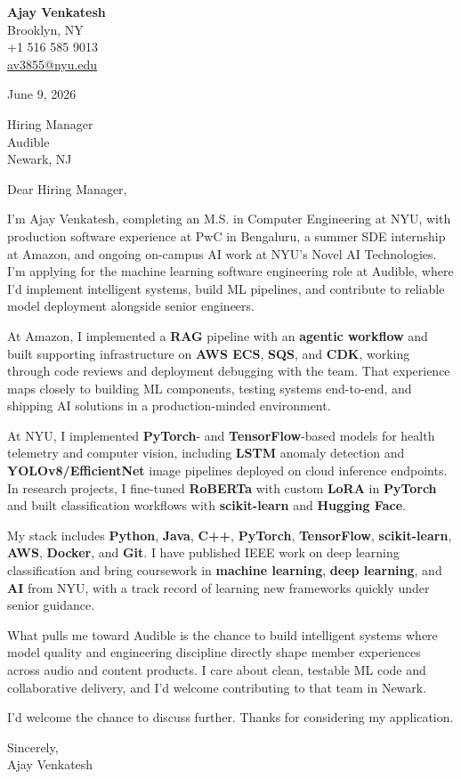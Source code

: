 \documentclass[letterpaper,11pt]{article}
\begin{document}
\begin{flushleft}
\textbf{\large Ajay Venkatesh} \\
Brooklyn, NY \\
+1 516 585 9013 \\
\href{mailto:av3855@nyu.edu}{av3855@nyu.edu}
\end{flushleft}
\vspace{10pt}
June 9, 2026
\vspace{6pt}

Hiring Manager \\
Audible \\
Newark, NJ

\vspace{10pt}

Dear Hiring Manager,

I'm Ajay Venkatesh, completing an M.S. in Computer Engineering at NYU, with production software experience at PwC in Bengaluru, a summer SDE internship at Amazon, and ongoing on-campus AI work at NYU's Novel AI Technologies. I'm applying for the machine learning software engineering role at Audible, where I'd implement intelligent systems, build ML pipelines, and contribute to reliable model deployment alongside senior engineers.

At Amazon, I implemented a \textbf{RAG} pipeline with an \textbf{agentic workflow} and built supporting infrastructure on \textbf{AWS ECS}, \textbf{SQS}, and \textbf{CDK}, working through code reviews and deployment debugging with the team. That experience maps closely to building ML components, testing systems end-to-end, and shipping AI solutions in a production-minded environment.

At NYU, I implemented \textbf{PyTorch}- and \textbf{TensorFlow}-based models for health telemetry and computer vision, including \textbf{LSTM} anomaly detection and \textbf{YOLOv8/EfficientNet} image pipelines deployed on cloud inference endpoints. In research projects, I fine-tuned \textbf{RoBERTa} with custom \textbf{LoRA} in \textbf{PyTorch} and built classification workflows with \textbf{scikit-learn} and \textbf{Hugging Face}.

My stack includes \textbf{Python}, \textbf{Java}, \textbf{C++}, \textbf{PyTorch}, \textbf{TensorFlow}, \textbf{scikit-learn}, \textbf{AWS}, \textbf{Docker}, and \textbf{Git}. I have published IEEE work on deep learning classification and bring coursework in \textbf{machine learning}, \textbf{deep learning}, and \textbf{AI} from NYU, with a track record of learning new frameworks quickly under senior guidance.

What pulls me toward Audible is the chance to build intelligent systems where model quality and engineering discipline directly shape member experiences across audio and content products. I care about clean, testable ML code and collaborative delivery, and I'd welcome contributing to that team in Newark.

I'd welcome the chance to discuss further. Thanks for considering my application.

\vspace{12pt}
Sincerely, \\
Ajay Venkatesh
\end{document}
